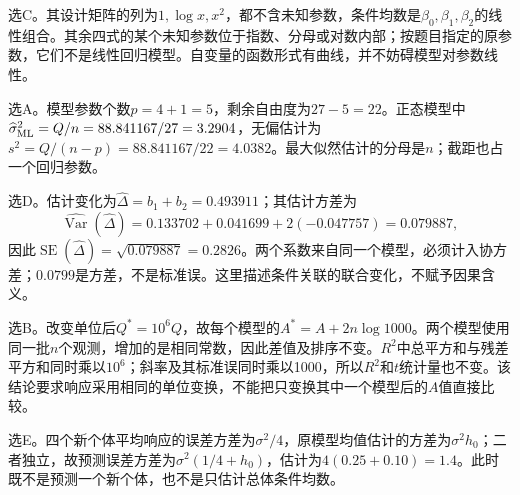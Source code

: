 选C。其设计矩阵的列为$1,\log x,x^2$，都不含未知参数，条件均数是$\beta_0,\beta_1,\beta_2$的线性组合。其余四式的某个未知参数位于指数、分母或对数内部；按题目指定的原参数，它们不是线性回归模型。自变量的函数形式有曲线，并不妨碍模型对参数线性。
\par\nobreak\smallskip{}

选A。模型参数个数$p=4+1=5$，剩余自由度为$27-5=22$。正态模型中$\widehat\sigma^2_{\rm ML}=Q/n=88.841167/27=3.2904$，无偏估计为$s^2=Q/(n-p)=88.841167/22=4.0382$。最大似然估计的分母是$n$；截距也占一个回归参数。
\par\nobreak\smallskip{}

选D。估计变化为$\widehat\Delta=b_1+b_2=0.493911$；其估计方差为\[\widehat{\operatorname{Var}}(\widehat\Delta)=0.133702+0.041699+2(-0.047757)=0.079887,\]因此$\operatorname{SE}(\widehat\Delta)=\sqrt{0.079887}=0.2826$。两个系数来自同一个模型，必须计入协方差；$0.0799$是方差，不是标准误。这里描述条件关联的联合变化，不赋予因果含义。
\par\nobreak\smallskip{}

选B。改变单位后$Q^*=10^6Q$，故每个模型的$A^*=A+2n\log1000$。两个模型使用同一批$n$个观测，增加的是相同常数，因此差值及排序不变。$R^2$中总平方和与残差平方和同时乘以$10^6$；斜率及其标准误同时乘以1000，所以$R^2$和$t$统计量也不变。该结论要求响应采用相同的单位变换，不能把只变换其中一个模型后的$A$值直接比较。
\par\nobreak\smallskip{}

选E。四个新个体平均响应的误差方差为$\sigma^2/4$，原模型均值估计的方差为$\sigma^2h_0$；二者独立，故预测误差方差为$\sigma^2(1/4+h_0)$，估计为$4(0.25+0.10)=1.4$。此时既不是预测一个新个体，也不是只估计总体条件均数。
\par\nobreak\smallskip{}

